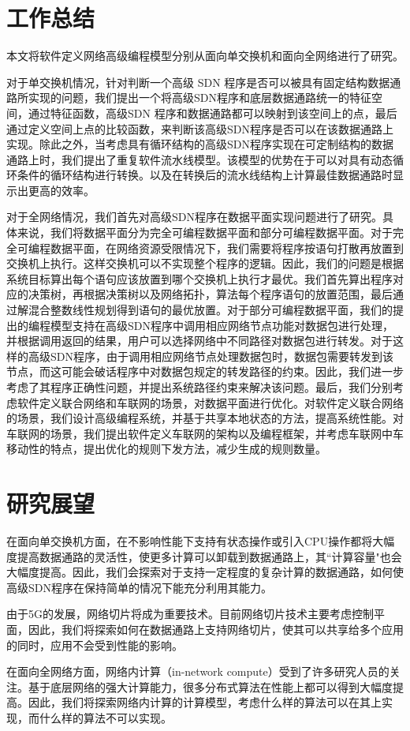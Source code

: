 \documentclass{ctexart}
\begin{document}
\section{工作总结}

本文将软件定义网络高级编程模型分别从面向单交换机和面向全网络进行了研究。

对于单交换机情况，针对判断一个高级 SDN 程序是否可以被具有固定结构数据通路所实现的问题，我们提出一个将高级SDN程序和底层数据通路统一的特征空间，通过特征函数，高级SDN 程序和数据通路都可以映射到该空间上的点，最后通过定义空间上点的比较函数，来判断该高级SDN程序是否可以在该数据通路上实现。除此之外，当考虑具有循环结构的高级SDN程序实现在可定制结构的数据通路上时，我们提出了重复软件流水线模型。该模型的优势在于可以对具有动态循环条件的循环结构进行转换。以及在转换后的流水线结构上计算最佳数据通路时显示出更高的效率。

对于全网络情况，我们首先对高级SDN程序在数据平面实现问题进行了研究。具体来说，我们将数据平面分为完全可编程数据平面和部分可编程数据平面。对于完全可编程数据平面，在网络资源受限情况下，我们需要将程序按语句打散再放置到交换机上执行。这样交换机可以不实现整个程序的逻辑。因此，我们的问题是根据系统目标算出每个语句应该放置到哪个交换机上执行才最优。我们首先算出程序对应的决策树，再根据决策树以及网络拓扑，算法每个程序语句的放置范围，最后通过解混合整数线性规划得到语句的最优放置。对于部分可编程数据平面，我们的提出的编程模型支持在高级SDN程序中调用相应网络节点功能对数据包进行处理，并根据调用返回的结果，用户可以选择网络中不同路径对数据包进行转发。对于这样的高级SDN程序，由于调用相应网络节点处理数据包时，数据包需要转发到该节点，而这可能会破话程序中对数据包规定的转发路径的约束。因此，我们进一步考虑了其程序正确性问题，并提出系统路径约束来解决该问题。最后，我们分别考虑软件定义联合网络和车联网的场景，对数据平面进行优化。对软件定义联合网络的场景，我们设计高级编程系统，并基于共享本地状态的方法，提高系统性能。对车联网的场景，我们提出软件定义车联网的架构以及编程框架，并考虑车联网中车移动性的特点，提出优化的规则下发方法，减少生成的规则数量。


\section{研究展望}

在面向单交换机方面，在不影响性能下支持有状态操作或引入CPU操作都将大幅度提高数据通路的灵活性，使更多计算可以卸载到数据通路上，其``计算容量"也会大幅度提高。因此，我们会探索对于支持一定程度的复杂计算的数据通路，如何使高级SDN程序在保持简单的情况下能充分利用其能力。

由于5G的发展，网络切片将成为重要技术。目前网络切片技术主要考虑控制平面，因此，我们将探索如何在数据通路上支持网络切片，使其可以共享给多个应用的同时，应用不会受到性能的影响。

在面向全网络方面，网络内计算（in-network compute）受到了许多研究人员的关注。基于底层网络的强大计算能力，很多分布式算法在性能上都可以得到大幅度提高。因此，我们将探索网络内计算的计算模型，考虑什么样的算法可以在其上实现，而什么样的算法不可以实现。
\end{document}
